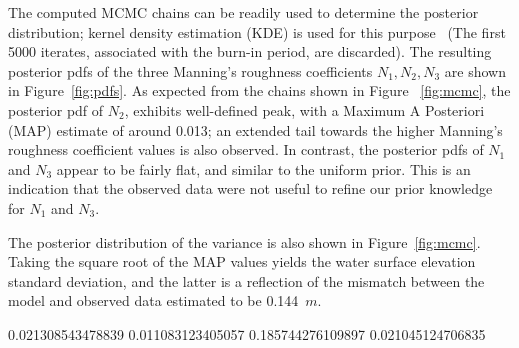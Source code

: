 The computed MCMC chains can be readily used to determine the posterior 
distribution; kernel density estimation (KDE) is used for this purpose
~\citep{Parzen1962,Silverman1986}(The first 5000 iterates, associated 
with the burn-in period, are discarded). The resulting posterior pdfs 
of the three Manning's roughness coefficients $N_1,N_2,N_3$ are shown 
in Figure~\ref{fig:pdfs}.  As expected from the chains shown in Figure
~\ref{fig:mcmc}, the posterior pdf of $N_2$, exhibits well-defined peak, 
with a Maximum A Posteriori (MAP) estimate of around 0.013; an extended tail 
towards the higher Manning's roughness coefficient values is also observed.
In contrast, the posterior pdfs of $N_1$ and $N_3$ appear to be fairly flat, 
and similar to the uniform prior. This is an indication that 
the observed data were not useful to refine our prior knowledge for $N_1$ and $N_3$.  

The posterior distribution of the variance is also shown in Figure~\ref{fig:mcmc}. 
Taking the square root of the MAP values yields the water surface elevation standard 
deviation, and the latter is a reflection of the mismatch between the model and 
observed data estimated to be 0.144~$m$.


   0.021308543478839   0.011083123405057   0.185744276109897   0.021045124706835



